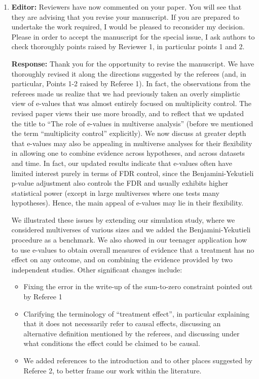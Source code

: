 \documentclass[11pt, a4paper]{article}
\newcommand{\reply}{\vspace{0.3cm} \noindent \textbf{Response:} {\it }}
\begin{document}
\begin{enumerate}[leftmargin=*]
    \item \textbf{Editor:} Reviewers have now commented on your paper. You will see that they are advising that you revise your manuscript. If you are prepared to undertake the work required, I would be pleased to reconsider my decision. Please in order to accept the manuscript for the special issue, I ask authors to check thoroughly points raised by Reviewer 1, in particular points 1 and 2.

    \reply Thank you for the opportunity to revise the manuscript. We have thoroughly revised it along the directions suggested by the referees (and, in particular, Points 1-2 raised by Referee 1). 
In fact, the observations from the referees made us realize that we had previously taken an overly simplistic view of e-values that was almost entirely focused on multiplicity control. The revised paper views their use more broadly, and to reflect that we updated the title to ``The role of e-values in multiverse analysis'' (before we mentioned the term ``multiplicity control'' explicitly).
We now discuss at greater depth that e-values may also be appealing in multiverse analyses for their flexibility in allowing one to combine evidence across hypotheses, and across datasets and time. In fact, our updated results indicate that e-values often have limited interest purely in terms of FDR control, since the Benjamini-Yekutieli p-value adjustment also controls the FDR and usually exhibits higher statistical power (except in large multiverses where one tests many hypotheses). Hence, the main appeal of e-values may lie in their flexibility.

We illustrated these issues by extending our simulation study, where we considered multiverses of various sizes and we added the Benjamini-Yekutieli procedure as a benchmark. We also showed in our teenager application how to use e-values to obtain overall measures of evidence that a treatment has no effect on any outcome, and on combining the evidence provided by two independent studies.
Other significant changes include:
\begin{itemize}[leftmargin=*]
\item  Fixing the error in the write-up of the sum-to-zero constraint pointed out by Referee 1

\item Clarifying the terminology of ``treatment effect'', in particular explaining that it does not necessarily refer to causal effects, discussing an alternative definition mentioned by the referees, and discussing under what conditions the effect could be claimed to be causal.
\item We added references to the introduction and to other places suggested by Referee 2, to better frame our work within the literature.


\end{itemize}
\end{enumerate}
\end{document}
